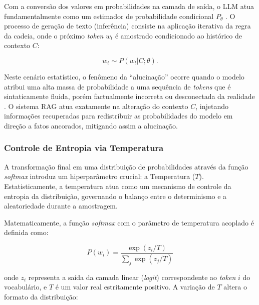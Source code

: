 Com a conversão dos valores em probabilidades na camada de saída, o LLM atua fundamentalmente como um estimador de probabilidade condicional $P_\theta$ \citep{bengio2003}. O processo de geração de texto (inferência) consiste na aplicação iterativa da regra da cadeia, onde o próximo \textit{token} $w_t$ é amostrado condicionado ao histórico de contexto $C$:

\begin{equation}
  w_t \sim P(w_t | C; \theta).
\end{equation}

Neste cenário estatístico, o fenômeno da ``alucinação'' ocorre quando o modelo atribui uma alta massa de probabilidade a uma sequência de \textit{tokens} que é sintaticamente fluida, porém factualmente incorreta ou desconectada da realidade \citep{ji2023}. O sistema RAG atua exatamente na alteração do contexto $C$, injetando informações recuperadas para redistribuir as probabilidades do modelo em direção a fatos ancorados, mitigando assim a alucinação.

\subsubsection{Controle de Entropia via Temperatura}

A transformação final em uma distribuição de probabilidades através da função \textit{softmax} introduz um hiperparâmetro crucial: a Temperatura ($T$). Estatisticamente, a temperatura atua como um mecanismo de controle da entropia da distribuição, governando o balanço entre o determinismo e a aleatoriedade durante a amostragem.

Matematicamente, a função \textit{softmax} com o parâmetro de temperatura acoplado é definida como:

\begin{equation}
  P(w_i) = \frac{\exp(z_i / T)}{\sum_{j} \exp(z_j / T)}
\end{equation}

onde $z_i$ representa a saída da camada linear (\textit{logit}) correspondente ao \textit{token} $i$ do vocabulário, e $T$ é um valor real estritamente positivo. A variação de $T$ altera o formato da distribuição:

